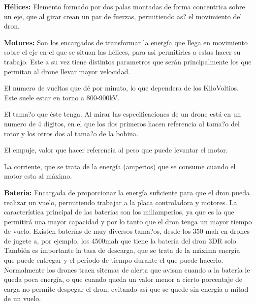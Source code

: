 \documentclass{article}
\begin{document}
\hspace{1 cm}\textbf{H\'elices:} Elemento formado por dos palas montadas de forma concentrica sobre un eje, que al girar crean un par de fuerzas, permitiendo as? el movimiento del dron.

\hspace{1 cm}\textbf{Motores:} Son los encargados de transformar la energ\'ia que llega en movimiento sobre el eje en el que se situan las h\'elices, para asi permitirles a estas hacer su trabajo. Este a su vez tiene distintos parametros que ser\'an principalmente los que permitan al drone llevar mayor velocidad. 

\hspace{1 cm} El numero de vueltas que d\'e por minuto, lo que dependera de los KiloVoltios. Este suele estar en torno a 800-900kV.

\hspace{1 cm} El tama?o que \'este tenga. Al mirar las especificaciones de un drone est\'a en un numero de 4 d\'igitos, en el que los dos primeros hacen referencia al tama?o del rotor y los otros dos al tama?o de la bobina. 

\hspace{1 cm} El empuje, valor que hacer referencia al peso que puede levantar el motor.

\hspace{1 cm} La corriente, que se trata de la energ\'ia (amperios) que se consume cuando el motor esta al m\'aximo.


\hspace{1 cm}\textbf{Bateria:} Encargada de proporcionar la energ\'ia suficiente para que el dron pueda realizar un vuelo, permitiendo trabajar a la placa controladora y motores. La caracter\'istica principal de las baterias son los miliamperios, ya que es la que permitir\'a una mayor capacidad y por lo tanto que el dron tenga un mayor tiempo de vuelo. Existen bater\'ias de muy diversos tama?os, desde los 350 mah en drones de jugete a, por ejemplo, los 4500mah que tiene la bater\'ia del dron 3DR solo. Tambi\'en es importante la tasa de descarga, que se trata de la m\'axima energ\'ia que puede entregar y el periodo de tiempo durante el que puede hacerlo. Normalmente los drones traen sitemas de alerta que avisan cuando a la bater\'ia le queda poca energ\'ia, o que cuando queda un valor menor a cierto porcentaje de carga no permite despegar el dron, evitando as\'i que se quede sin energ\'ia a mitad de un vuelo.
\end{document}
